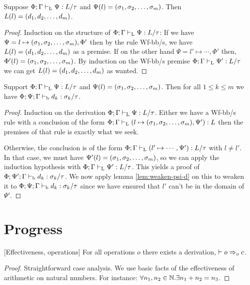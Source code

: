 \documentclass[a4paper, oneside, 10pt, draft]{memoir}
\begin{document}
\begin{lem}
  \label{lem:tpbb-lookup}
  Suppose $\Phi;\Gamma |-_{\mathrm{L}} \Psi : L / \tau$ and $\Psi(l) =
  (\sigma_1, \sigma_2, \dotsc, \sigma_m)$. Then $L(l) = (d_1, d_2, \dotsc, d_m)$.
\end{lem}
\begin{proof}
  Induction on the structure of $\Phi;\Gamma |-_{\mathrm{L}} \Psi : L / \tau$:
  If we have $\Psi = l \mapsto (\sigma_1, \sigma_2, \dotsc, \sigma_m), \Phi'$ then by the rule Wf-bb/s, we
  have $L(l) = (d_1, d_2, \dotsc, d_m)$ as a premise. If on the other hand $\Psi = l'
  \mapsto \dotsb, \Phi'$ then, $\Phi'(l) = (\sigma_1, \sigma_2, \dotsc, \sigma_m)$. By induction on
  the Wf-bb/s premise $\Phi;\Gamma |-_{\mathrm{L}} \Psi' : L / \tau$ we can get $L(l) =
  (d_1, d_2, \dotsc, d_m)$ as wanted.
\end{proof}

\begin{lem}
  \label{lem:preservation-lookup}
  Support $\Phi;\Gamma |-_{\mathrm{L}} \Psi : L / \tau$ and $\Psi(l) =
  (\sigma_1, \sigma_2, \dotsc, \sigma_m)$. Then for all $1 \leq k \leq m$ we have $\Phi;\Psi;\Gamma
  |-_{\mathrm{b}} d_k : \sigma_k / \tau$.
\end{lem}
\begin{proof}
  Induction on the derivation $\Phi;\Gamma |-_{\mathrm{L}} \Psi : L /
  \tau$. Either we have a Wf-bb/s rule with a conclusion of the form
  $\Phi;\Gamma |-_{\mathrm{L}} (l \mapsto (\sigma_1, \sigma_2, \dotsc, \sigma_m), \Psi') : L$ then the
  premises of that rule is exactly what we seek.

  Otherwise, the conclusion is of the form $\Phi;\Gamma |-_{\mathrm{L}} (l'
  \mapsto \dotsb, \Psi') : L/\tau$ with $l \neq l'$. In that case, we must have
  $\Psi'(l) = (\sigma_1, \sigma_2, \dotsc, \sigma_m)$, so we can apply the induction hypothesis with
  $\Phi;\Gamma |-_{\mathrm{L}} \Psi' : L / \tau$. This yields a proof of
  $\Phi;\Psi';\Gamma |-_{\mathrm{b}} d_k : \sigma_k / \tau$. We now apply lemma
  \ref{lem:weaken-psi-d} on this to weaken it to $\Phi;\Psi;\Gamma
  |-_{\mathrm{b}} d_k : \sigma_k / \tau$ since we have ensured that $l'$ can't be
  in the domain of $\Psi'$.
\end{proof}

\section{Progress}

\begin{lem}{[Effectiveness, operations]}
  \label{lem:can-step-op}
  For all operations $o$ there exists a derivation, $|- o =>_{o} c$.
\end{lem}
\begin{proof}
  Straightforward case analysis. We use basic facts of the
  effectiveness of arithmetic on natural numbers. For instance:
  $\forall n_1, n_2 \in \mathbb{N} . \exists n_1 + n_2 = n_3$.
\end{proof}
\end{document}
